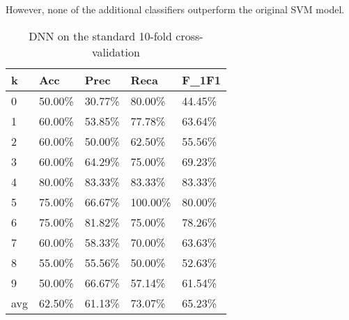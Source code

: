\documentclass{article}
\begin{document}
However, none of the additional classifiers outperform the original SVM model. 

\begin{table}[h]
	\centering
	\caption{DNN on the standard 10-fold cross-validation}
	\begin{tabular}{|l|l|l|l|l|}
	\hline
	\textbf{k} & \textbf{Acc} & \textbf{Prec} & \textbf{Reca} & \textbf{F\_1F1} \\ \hline
	0          & 50.00\%      & 30.77\%       & 80.00\%       & 44.45\%         \\ \hline
	1          & 60.00\%      & 53.85\%       & 77.78\%       & 63.64\%         \\ \hline
	2          & 60.00\%      & 50.00\%       & 62.50\%       & 55.56\%         \\ \hline
	3          & 60.00\%      & 64.29\%       & 75.00\%       & 69.23\%         \\ \hline
	4          & 80.00\%      & 83.33\%       & 83.33\%       & 83.33\%         \\ \hline
	5          & 75.00\%      & 66.67\%       & 100.00\%      & 80.00\%         \\ \hline
	6          & 75.00\%      & 81.82\%       & 75.00\%       & 78.26\%         \\ \hline
	7          & 60.00\%      & 58.33\%       & 70.00\%       & 63.63\%         \\ \hline
	8          & 55.00\%      & 55.56\%       & 50.00\%       & 52.63\%         \\ \hline
	9          & 50.00\%      & 66.67\%       & 57.14\%       & 61.54\%         \\ \hline
	avg        & 62.50\%      & 61.13\%       & 73.07\%       & 65.23\%         \\ \hline
	\end{tabular}
	\end{table}
\end{document}
